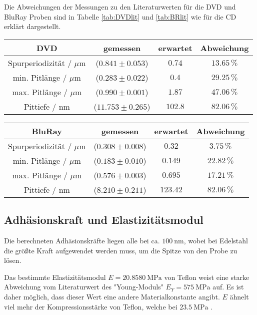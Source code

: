         Die Abweichungen der Messungen zu den Literaturwerten für die DVD und BluRay Proben sind in Tabelle \ref{tab:DVDlit} und \ref{tab:BRlit} wie für die CD erklärt dargestellt.
        \begin{center}
            \label{tab:DVDlit}
            \begin{tabular}{c c c c}
                \toprule
                DVD & gemessen & erwartet & Abweichung \\
                \midrule
                Spurperiodizität / $\mu\text{m}$   & ($0.841\pm 0.053$) & $0.74$ & $13.65\,\%$ \\
                min. Pitlänge / $\mu\text{m}$ & ($0.283\pm 0.022$) & $0.4$ & $29.25\,\%$ \\
                max. Pitlänge / $\mu\text{m}$ & ($0.990\pm 0.001$) & $1.87$ & $47.06\,\%$ \\
                Pittiefe / $\text{nm}$        & ($11.753\pm 0.265$)& $102.8$& $82.06\,\%$ \\
                \bottomrule
            \end{tabular}
        \end{center}
        \begin{center}
            \label{tab:BRlit}
            \begin{tabular}{c c c c}
                \toprule
                BluRay & gemessen & erwartet & Abweichung \\
                \midrule
                Spurperiodizität / $\mu\text{m}$   & ($0.308\pm 0.008$) & $0.32$   & $3.75\,\%$ \\
                min. Pitlänge / $\mu\text{m}$ & ($0.183\pm 0.010$) & $0.149$ & $22.82\,\%$ \\
                max. Pitlänge / $\mu\text{m}$ & ($0.576\pm 0.003$) & $0.695$ & $17.21\,\%$ \\
                Pittiefe / $\text{nm}$        & ($8.210\pm 0.211$) & $123.42$& $82.06\,\%$ \\
                \bottomrule
            \end{tabular}
        \end{center}
        \FloatBarrier
    \subsection{Adhäsionskraft und Elastizitätsmodul}
        Die berechneten Adhäsionskräfte liegen alle bei ca. $\SI{100}{\nano\metre}$, wobei bei Edelstahl die größte Kraft aufgewendet werden muss, um die Spitze von den Probe zu lösen.

        Das bestimmte Elastizitätsmodul $E = \SI{20.8580}{\mega\pascal}$ von Teflon weist eine starke Abweichung vom Literaturwert des "Young-Moduls"  $E_Y = \SI{575}{\mega\pascal}$ auf. Es ist daher möglich, dass dieser Wert eine andere Materialkonstante angibt. $E$ ähnelt viel mehr der Kompressionsstärke von Teflon, welche bei $\SI{23.5}{\mega\pascal}$ \cite{Teflon}.